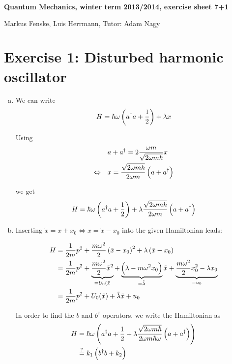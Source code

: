 \documentclass[a4paper,german,12pt,smallheadings]{scrartcl}
\begin{document}
\allowdisplaybreaks %
\begin{center}
\bfseries %
\sffamily %
\vspace{-40pt}
Quantum Mechanics, winter term 2013/2014, exercise sheet 7+1

Markus Fenske, Luis Herrmann, Tutor: Adam Nagy
\vspace{-10pt}
\end{center}

\section*{Exercise 1: Disturbed harmonic oscillator}
\begin{enumerate}[a)]
  \item
We can write
\begin{equation*}
  H = \hbar \omega \del{a^\dagger a + \frac{1}{2}} + \lambda x
\end{equation*}

Using
\begin{align*}
  &a + a^\dagger = 2 \frac{\omega m}{\sqrt{2 \omega m \hbar}} x \\
  \Leftrightarrow\quad& x = \frac{\sqrt{2 \omega m \hbar}}{2 \omega m} \del{a + a^\dagger}
\end{align*}

we get
\begin{equation*}
  H = \hbar \omega \del{a^\dagger a + \frac{1}{2}} + \lambda \frac{\sqrt{2 \omega m \hbar}}{2 \omega m} \del{a + a^\dagger}
\end{equation*}

\item
Inserting $\tilde x = x + x_0 \Leftrightarrow x = \tilde x - x_0$ into the
given Hamiltonian leads:

\begin{align*}
  H &= \frac{1}{2m} p^2 + \frac{m \omega^2}{2} \del{\tilde x - x_0}^2 + \lambda \del{\tilde x - x_0} \\
    &= \frac{1}{2m} p^2 + \underbrace{\frac{m \omega^2}{2} \tilde x^2}_{= U_0(\tilde x} + \underbrace{\del{\lambda - m\omega^2 x_0}}_{= \tilde \lambda} \tilde x + \underbrace{\frac{m \omega^2}{2} x_0^2 - \lambda x_0}_{=u_0} \\
    &= \frac{1}{2m} p^2 + U_0(\tilde x) + \tilde \lambda \tilde x + u_0
\end{align*}

In order to find the $b$ and $b^\dagger$ operators, we write the Hamiltonian as
\begin{align*}
  H &= \hbar \omega \del{a^\dagger a + \frac{1}{2} + \lambda \frac{\sqrt{2 \omega m \hbar}}{2 \omega m \hbar \omega} \del{a + a^\dagger}} \\
    &\overset{?}{=} k_1 \del{b^\dagger b + k_2}
\end{align*}


\end{enumerate}
\end{document}
